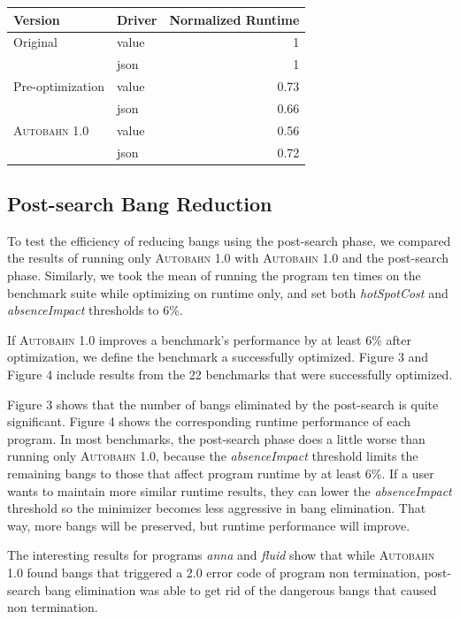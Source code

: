 \documentclass[format=sigplan, review=true]{acmart}
\newcommand{\hotspotcost}[0]{\textit{hotSpotCost}}
\newcommand{\dangerous}[0]{dangerous}
\newcommand{\Ao}[0]{\textsc{Autobahn 1.0}}
\newcommand{\postopt}[0]{post-search}
\newcommand{\Postopt}[0]{Post-search}
\newcommand{\absim}[0]{\textit{absenceImpact}}
\begin{document}
\begin{tabular}{llr}
\hline
Version   & Driver & Normalized Runtime \\
\hline
Original      & value   & 1     \\
          & json        & 1      \\
Pre-optimization       & value     & 0.73     \\
          & json        & 0.66	\\
\Ao{}       & value     & 0.56      \\
          & json        & 0.72	\\

\hline
\end{tabular}

\subsection{\Postopt{} Bang Reduction}

To test the efficiency of reducing bangs using the \postopt{} phase, we compared the results of running only \Ao{} with \Ao{} and the \postopt{} phase. Similarly, we took the mean of running the program ten times on the benchmark suite while optimizing on runtime only, and set both \hotspotcost{} and \absim{} thresholds to 6\%. 

If \Ao{} improves a benchmark's performance by at least 6\% after optimization, we define the benchmark a successfully optimized. Figure 3 and Figure 4 include results from the 22 benchmarks that were successfully optimized. 

Figure 3 shows that the number of bangs eliminated by the \postopt{} is quite significant. Figure 4 shows the corresponding runtime performance of each program. In most benchmarks, the \postopt{} phase does a little worse than running only \Ao{}, because the \absim{} threshold limits the remaining bangs to those that affect program runtime by at least 6\%. If a user wants to maintain more similar runtime results, they can lower the \absim{} threshold so the minimizer becomes less aggressive in bang elimination. That way, more bangs will be preserved, but runtime performance will improve. 

The interesting results for programs \textit{anna} and \textit{fluid} show that while \Ao{} found bangs that triggered a 2.0 error code of program non termination, \postopt{} bang elimination was able to get rid of the \dangerous{} bangs that caused non termination.
\end{document}
